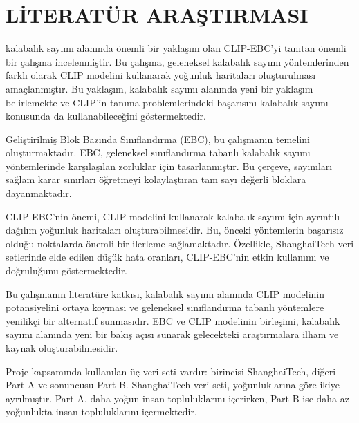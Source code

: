 \documentclass[10pt,a4paper]{report}
\begin{document}
\section{LİTERATÜR ARAŞTIRMASI}
\begin{justify}
	kalabalık sayımı alanında önemli bir yaklaşım olan CLIP-EBC'yi tanıtan önemli bir çalışma incelenmiştir\cite{ma2024clip}. Bu çalışma, geleneksel kalabalık sayımı yöntemlerinden farklı olarak CLIP modelini kullanarak yoğunluk haritaları oluşturulması amaçlanmıştır. Bu yaklaşım, kalabalık sayımı alanında yeni bir yaklaşım belirlemekte ve CLIP'in tanıma problemlerindeki başarısını kalabalık sayımı konusunda da kullanabileceğini göstermektedir.\newline
	
	
	Geliştirilmiş Blok Bazında Sınıflandırma (EBC), bu çalışmanın temelini oluşturmaktadır. EBC, geleneksel sınıflandırma tabanlı kalabalık sayımı yöntemlerinde karşılaşılan zorluklar için tasarlanmıştır. Bu çerçeve, sayımları sağlam karar sınırları öğretmeyi kolaylaştıran tam sayı değerli bloklara dayanmaktadır.\newline
	
	CLIP-EBC'nin önemi, CLIP modelini kullanarak kalabalık sayımı için ayrıntılı dağılım yoğunluk haritaları oluşturabilmesidir. Bu, önceki yöntemlerin başarısız olduğu noktalarda önemli bir ilerleme sağlamaktadır. Özellikle, ShanghaiTech veri setlerinde elde edilen düşük hata oranları, CLIP-EBC'nin etkin kullanımı ve doğruluğunu göstermektedir.\newline
	
	
	Bu çalışmanın literatüre katkısı, kalabalık sayımı alanında CLIP modelinin potansiyelini ortaya koyması ve geleneksel sınıflandırma tabanlı yöntemlere yenilikçi bir alternatif sunmasıdır. EBC ve CLIP modelinin birleşimi, kalabalık sayımı alanında yeni bir bakış açısı sunarak gelecekteki araştırmalara ilham ve kaynak oluşturabilmesidir.\newline
	
	
	Proje kapsamında kullanılan üç veri seti vardır: birincisi ShanghaiTech, diğeri Part A ve sonuncusu Part B. ShanghaiTech veri seti, yoğunluklarına göre ikiye ayrılmıştır. Part A, daha yoğun insan topluluklarını içerirken, Part B ise daha az yoğunlukta insan topluluklarını içermektedir\cite{zhang2016single}\cite{thien2016shanghaitech}.
	
	\clearpage

	
\begin{landscape} %
		

\end{landscape}
\end{justify}
\end{document}
